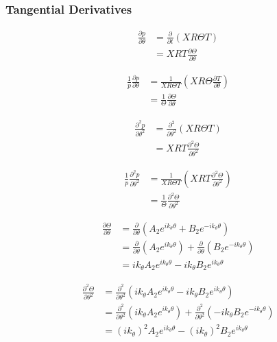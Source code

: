 \documentclass[a4paper]{article}
\begin{document}
\subsubsection{Tangential Derivatives}

\begin{align*}
    \frac{\partial p}{\partial \theta } 
    &=
    \frac{\partial }{\partial t}  \left( XR\Theta T \right) \\
    &=
    XRT\frac{\partial \Theta}{\partial \theta}  
\end{align*}


\begin{align*}
    \frac{1}{p}\frac{\partial p}{\partial \theta} 
    &=
    \frac{ 1}{X R \Theta T}  \left( XR\Theta\frac{\partial T}{\partial \theta} \right) \\
    &=\frac{ 1}{ \Theta}\frac{\partial \Theta}{\partial \theta}  
\end{align*}

\begin{align*}
    \frac{\partial^2 p}{\partial \theta^2} 
    &=
    \frac{\partial^2 }{\partial \theta^2}  \left( XR\Theta T \right) \\
    &=
    XRT\frac{\partial^2 \Theta }{\partial \theta^2}  
\end{align*}


\begin{align*}
    \frac{1}{p}\frac{\partial^2 p}{\partial \theta^2} 
    &=
    \frac{ 1}{X R \Theta T}  \left( XRT\frac{\partial^2 \Theta}{\partial \theta^2} \right) \\
    &=\frac{ 1}{ \Theta}\frac{\partial^2 \Theta}{\partial \theta^2}  
\end{align*}

\begin{align*}
    \frac{\partial \Theta}{\partial \theta} &=
    \frac{\partial}{\partial \theta}
        \left( 
            A_2 e^{i k_{\theta} \theta} + B_2 e^{-i k_{\theta} \theta}
        \right)  \\
    &=
    \frac{\partial}{\partial \theta} \left(A_2 e^{i k_{\theta} \theta}  \right) +
    \frac{\partial}{\partial \theta} \left(B_2 e^{-i k_{\theta} \theta}  \right)\\ 
    &= i k_{\theta} A_2 e^{i k_{\theta} \theta} - i k_{\theta} B_2 e^{i k_{\theta} \theta} 
\end{align*}

\begin{align*}
    \frac{\partial^2 \Theta }{\partial \theta^2} &=
    \frac{\partial^2}{\partial \theta^2}
        \left( 
        i k_{\theta} A_2 e^{i k_{\theta} \theta} - i k_{\theta} B_2 e^{i k_{\theta} \theta} 
    \right)  \\
    &=
    \frac{\partial^2}{\partial \theta^2} \left(i k_{\theta} A_2 e^{i k_{\theta} \theta}  \right) +
    \frac{\partial^2}{\partial \theta^2} \left(- i k_{\theta} B_2 e^{-i k_{\theta} \theta}  \right)\\ 
    &= (i k_{\theta})^2 A_2 e^{i k_{\theta} \theta } - (i k_{\theta})^2 B_2 e^{i k_{\theta} \theta} 
\end{align*}
\end{document}
